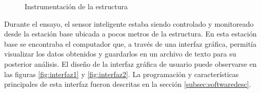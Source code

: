 \begin{figure}[H]
    \centering
    \hfill
    \caption{Instrumentación de la estructura}
    \label{fig:inst}
\end{figure}

Durante el ensayo, el sensor inteligente estaba siendo controlado y monitoreado desde la estación base ubicada a pocos metros de la estructura. En esta estación base se encontraba el computador que, a través de una interfaz gráfica, permitía visualizar los datos obtenidos y guardarlos en un archivo de texto para su posterior análisis. El diseño de la interfaz gráfica de usuario puede observarse en las figuras \ref{fig:interfaz1} y \ref{fig:interfaz2}. La programación y características principales de esta interfaz fueron descritas en la sección \ref{subsec:softwaredesc}.

